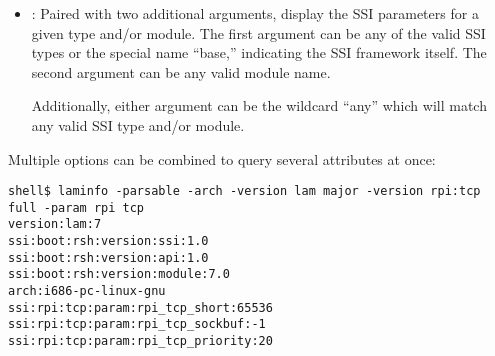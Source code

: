 \begin{itemize}
  The second argument specifies the scope of the version number to
  display -- whether to show the entire version number string, or just
  one component of it:

  \begin{itemize}
  \item {}: Display the entire version number string
  \item {}: Display the major version number
  \item {}: Display the minor version number
  \item {}: Display the release version number
  \item {}: Display the alpha version number
  \item {}: Display the beta version number
  \item {}: Display the SVN version number\footnote{The
      value will either be 0 (not built from SVN), 1 (built from a
      Subverstion checkout) or a date encoded in the form YYYYMMDD
      (built from a nightly tarball on the given date)}

  \end{itemize}


\item {}: Paired with two additional arguments, display
  the SSI parameters for a given type and/or module.  The first
  argument can be any of the valid SSI types or the special name
  ``base,'' indicating the SSI framework itself.  The second argument
  can be any valid module name.
  
  Additionally, either argument can be the wildcard ``any'' which
  will match any valid SSI type and/or module.

\end{itemize}

Multiple options can be combined to query several attributes at once:

\lstset{style=lam-cmdline}
\begin{lstlisting}
shell$ laminfo -parsable -arch -version lam major -version rpi:tcp full -param rpi tcp
version:lam:7
ssi:boot:rsh:version:ssi:1.0
ssi:boot:rsh:version:api:1.0
ssi:boot:rsh:version:module:7.0
arch:i686-pc-linux-gnu
ssi:rpi:tcp:param:rpi_tcp_short:65536
ssi:rpi:tcp:param:rpi_tcp_sockbuf:-1
ssi:rpi:tcp:param:rpi_tcp_priority:20
\end{lstlisting}

